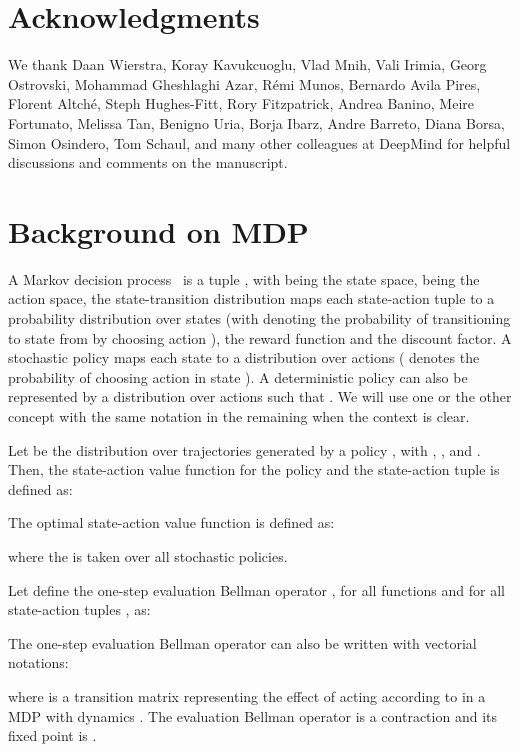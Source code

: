 \documentclass{article}
\begin{document}
\section*{Acknowledgments}
We thank Daan Wierstra, Koray Kavukcuoglu, Vlad Mnih, Vali Irimia, Georg Ostrovski, Mohammad Gheshlaghi Azar, R\'emi Munos, Bernardo Avila Pires, Florent Altch\'e, Steph Hughes-Fitt, Rory Fitzpatrick, Andrea Banino, Meire Fortunato, Melissa Tan, Benigno Uria, Borja Ibarz, Andre Barreto, Diana Borsa, Simon Osindero, Tom Schaul, and many other colleagues at DeepMind for helpful discussions and comments on the manuscript.




\appendix
\onecolumn

\section{Background on MDP}
\label{app:background}
A Markov decision process~\citep[MDP; ][]{puterman1990markov} is a tuple , with  being the state space,  being the action space,  the state-transition distribution maps each state-action tuple  to a probability distribution over states (with  denoting the probability of transitioning to state  from  by choosing action ), the reward function  and  the discount factor. A stochastic policy  maps each state to a distribution over actions ( denotes the probability of choosing action  in state ). A deterministic policy  can also be represented by a distribution over actions  such that . We will use one or the other concept with the same notation  in the remaining when the context is clear. 

Let  be the distribution over trajectories  generated by a policy , with , ,  and . Then, the state-action value function  for the policy  and the  state-action tuple  is defined as:

The optimal state-action value function  is defined as:

where the  is taken over all stochastic policies.

Let define the one-step evaluation Bellman operator , for all functions  and for all state-action tuples , as:

The one-step evaluation Bellman operator can also be written with vectorial notations:

where  is a transition matrix representing the effect of acting according to  in a MDP with dynamics . The evaluation Bellman operator is a contraction and its fixed point is . 
\end{document}
